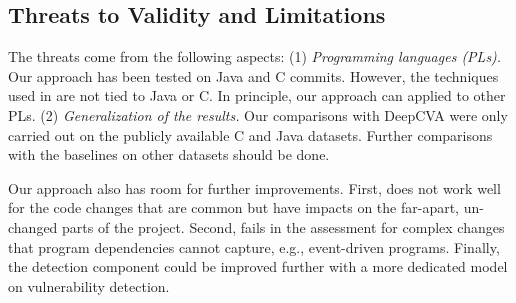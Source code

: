 \subsection{Threats to Validity and Limitations}
The threats come from the following aspects: (1) \emph{Programming
languages (PLs).}  Our approach has been tested on Java and C
commits. However, the techniques used in {\tool} are not tied to Java
or C.  In principle, our approach can applied to other
PLs. (2) \emph{Generalization of the results.}  Our comparisons with
DeepCVA were only carried out on the publicly available C and Java
datasets. Further comparisons with the baselines on other datasets should be
done.

Our approach also has room for further improvements. First, {\tool}
does not work well for the code changes that are common but have
impacts on the far-apart, un-changed parts of the project. Second,
{\tool} fails in the assessment for complex changes that program
dependencies cannot capture, e.g., event-driven programs.  Finally,
the detection component could be improved further with a more dedicated
model on vulnerability detection.
